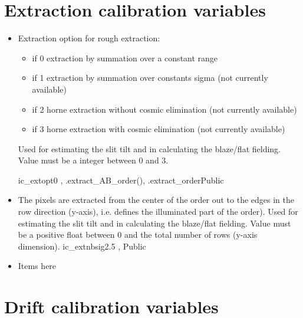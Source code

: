 \clearpage
\newpage
\section{Extraction calibration variables}
\label{ch:variables:extraction}

\begin{itemize}

\item {}
{Extraction option for rough extraction:
\begin{itemize}
\item if 0 extraction by summation over a constant range
\item if 1 extraction by summation over constants sigma (not currently available)
\item if 2 horne extraction without cosmic elimination (not currently available)
\item if 3 horne extraction with cosmic elimination (not currently available)
\end{itemize}
 Used for estimating the slit tilt and in calculating the blaze/flat fielding. Value must be a integer between 0 and 3.
}
{ic\_extopt}{0}
{\calSLIT, \calFFraw}{\constantsfile}
{\spirouEXTOR.extract\_AB\_order(), \spirouEXTOR.extract\_order}{Public}

\item {}
{The pixels are extracted from the center of the order out to the edges in the row direction (y-axis), i.e. defines the illuminated part of the order). Used for estimating the slit tilt and in calculating the blaze/flat fielding. Value must be a positive float between 0 and the total number of rows (y-axis dimension).}
{ic\_extnbsig}{2.5}
{\calSLIT, \calFFraw}{}{}{Public}


\item Items here
% 

\end{itemize}


\clearpage
\newpage
\section{Drift calibration variables}
\label{ch:variables:drift}

